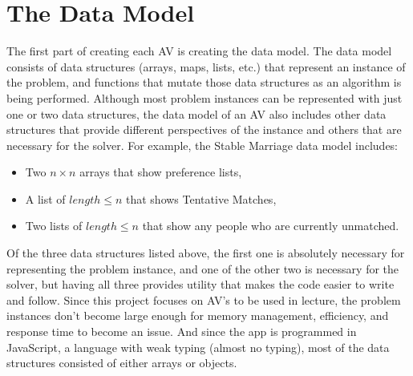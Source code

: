 \section{The Data Model}
\hspace{-0.26in}
The first part of creating each AV is creating the data model. 
The data model consists of 
data structures (arrays, maps, lists, etc.)
that represent an instance of the problem, 
and functions that mutate those data structures as an algorithm is being performed. 
Although most problem instances can be represented with just one or two data structures, 
the data model of an AV also includes other data structures that 
provide different perspectives of the instance and others that are necessary for the solver.
For example, the Stable Marriage data model includes: 
\begin{itemize}
	\item Two $n \times n$ arrays that show preference lists, 
	\item A list of $length \leq n$ that shows Tentative Matches, 
	\item Two lists of $length \leq n$ that show any people who are currently unmatched. 
\end{itemize}
Of the three data structures listed above, the first one is absolutely necessary for 
representing the problem instance, 
and one of the other two is necessary for the solver, but having all three
provides utility that makes the code easier to write and follow.
\newline\newline
Since this project focuses on AV's to be used in lecture, 
the problem instances don't become large enough for 
memory management, efficiency, and response time 
to become an issue. 
And since the app is programmed in JavaScript, 
a language with weak typing (almost no typing), most of the data structures 
consisted of either arrays or objects.
%
